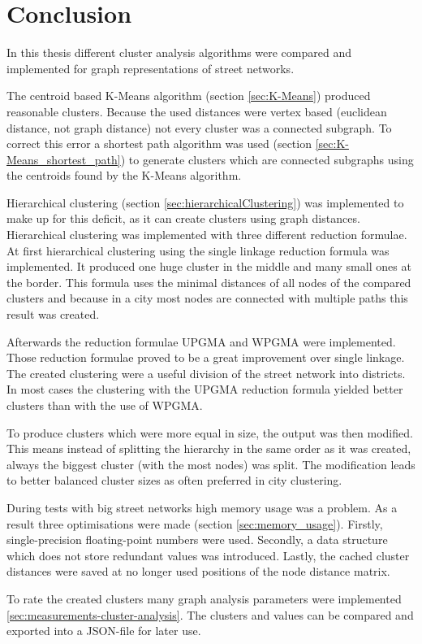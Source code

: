 \chapter{Conclusion}
In this thesis different cluster analysis algorithms were compared and implemented for graph representations of street networks.

The centroid based K-Means algorithm (section \ref{sec:K-Means}) produced reasonable clusters. Because the used distances were vertex based (euclidean distance, not graph distance) not every cluster was a connected subgraph. To correct this error a shortest path algorithm was used (section \ref{sec:K-Means_shortest_path}) to generate clusters which are connected subgraphs using the centroids found by the K-Means algorithm.

Hierarchical clustering (section \ref{sec:hierarchicalClustering}) was implemented to make up for this deficit, as it can create clusters using graph distances. Hierarchical clustering was implemented with three different reduction formulae. At first hierarchical clustering using the single linkage reduction formula was implemented. It produced one huge cluster in the middle and many small ones at the border. This formula uses the minimal distances of all nodes of the compared clusters and because in a city most nodes are connected with multiple paths this result was created.

Afterwards the reduction formulae \gls{UPGMA} and \gls{WPGMA} were implemented. Those reduction formulae proved to be a great improvement over single linkage. The created clustering were a useful division of the street network into districts. In most cases the clustering with the \gls{UPGMA} reduction formula yielded better clusters than with the use of \gls{WPGMA}.

To produce clusters which were more equal in size, the output was then modified. This means instead of splitting the hierarchy in the same order as it was created, always the biggest cluster (with the most nodes) was split. The modification leads to better balanced cluster sizes as often preferred in city clustering.

During tests with big street networks high memory usage was a problem. As a result three optimisations were made (section \ref{sec:memory_usage}). Firstly, single-precision floating-point numbers were used. Secondly, a data structure which does not store redundant values was introduced. Lastly, the cached cluster distances were saved at no longer used positions of the node distance matrix.

To rate the created clusters many graph analysis parameters were implemented \ref{sec:measurements-cluster-analysis}. The clusters and values can be compared and exported into a JSON-file for later use.